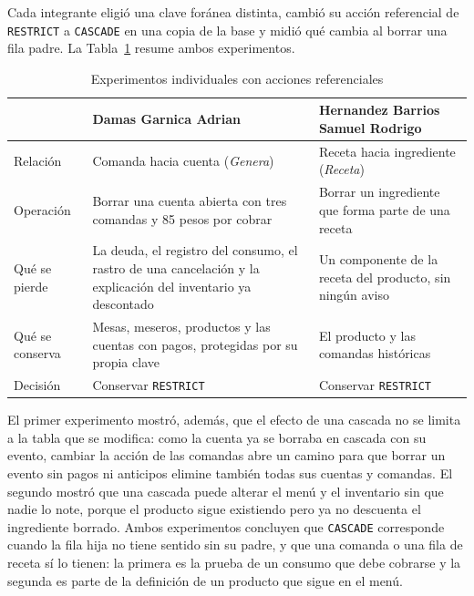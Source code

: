 Cada integrante eligió una clave foránea distinta, cambió su acción referencial de \texttt{RESTRICT} a \texttt{CASCADE} en una copia de la base y midió qué cambia al borrar una fila padre. La Tabla~\ref{tab:experimentos} resume ambos experimentos.

\begin{table}[H]
    \centering
    \small
    \begin{tabularx}{\textwidth}
        {
            >{\RaggedRight\arraybackslash}p{3.4cm}
            >{\RaggedRight\arraybackslash}X
            >{\RaggedRight\arraybackslash}X
        }
        \toprule
        & \textbf{Damas Garnica Adrian} & \textbf{Hernandez Barrios Samuel Rodrigo} \\
        \midrule
        Relación & Comanda hacia cuenta (\textit{Genera}) & Receta hacia ingrediente (\textit{Receta}) \\
        Operación & Borrar una cuenta abierta con tres comandas y 85 pesos por cobrar & Borrar un ingrediente que forma parte de una receta \\
        Qué se pierde & La deuda, el registro del consumo, el rastro de una cancelación y la explicación del inventario ya descontado & Un componente de la receta del producto, sin ningún aviso \\
        Qué se conserva & Mesas, meseros, productos y las cuentas con pagos, protegidas por su propia clave & El producto y las comandas históricas \\
        Decisión & Conservar \texttt{RESTRICT} & Conservar \texttt{RESTRICT} \\
        \bottomrule
    \end{tabularx}
    \captionsetup{labelfont=bf, textfont=it, labelsep=newline, justification=raggedright, singlelinecheck=false}
    \caption{Experimentos individuales con acciones referenciales}
    \label{tab:experimentos}
\end{table}

El primer experimento mostró, además, que el efecto de una cascada no se limita a la tabla que se modifica: como la cuenta ya se borraba en cascada con su evento, cambiar la acción de las comandas abre un camino para que borrar un evento sin pagos ni anticipos elimine también todas sus cuentas y comandas. El segundo mostró que una cascada puede alterar el menú y el inventario sin que nadie lo note, porque el producto sigue existiendo pero ya no descuenta el ingrediente borrado. Ambos experimentos concluyen que \texttt{CASCADE} corresponde cuando la fila hija no tiene sentido sin su padre, y que una comanda o una fila de receta sí lo tienen: la primera es la prueba de un consumo que debe cobrarse y la segunda es parte de la definición de un producto que sigue en el menú.
